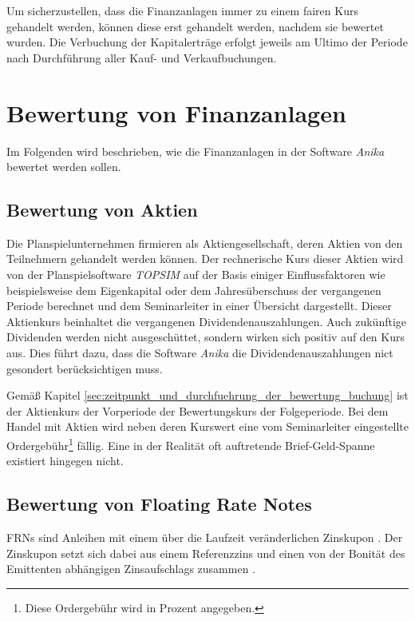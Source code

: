 \documentclass[12pt, a4paper]{article}
\theoremstyle{plain}
\begin{document}
Um sicherzustellen, dass die Finanzanlagen immer zu einem fairen Kurs gehandelt werden, können diese erst gehandelt werden, nachdem sie bewertet wurden. 
Die Verbuchung der Kapitalerträge erfolgt jeweils am Ultimo der Periode nach Durchführung aller Kauf- und Verkaufbuchungen.

\section{Bewertung von Finanzanlagen}
\label{sec:bewertung_von_finanzanlagen}
Im Folgenden wird beschrieben, wie die Finanzanlagen in der Software \textit{Anika} bewertet werden sollen.

\subsection{Bewertung von Aktien}
\label{sec:bewertung_von_aktien}
Die Planspielunternehmen firmieren als Aktiengesellschaft, deren Aktien von den Teilnehmern gehandelt werden können.
Der rechnerische Kurs dieser Aktien wird von der Planspielsoftware \textit{TOPSIM} auf der Basis einiger Einflussfaktoren wie beispielsweise dem Eigenkapital oder dem Jahresüberschuss der vergangenen Periode berechnet und dem Seminarleiter in einer Übersicht dargestellt.
Dieser Aktienkurs beinhaltet die vergangenen Dividendenauszahlungen. Auch zukünftige Dividenden werden nicht ausgeschüttet, sondern wirken sich positiv auf den Kurs aus. Dies führt dazu, dass die Software \textit{Anika} die Dividendenauszahlungen nict gesondert berücksichtigen muss.

Gemäß Kapitel \ref{sec:zeitpunkt_und_durchfuehrung_der_bewertung_buchung} ist der Aktienkurs der Vorperiode der Bewertungskurs der Folgeperiode.
Bei dem Handel mit Aktien wird neben deren Kurswert eine vom Seminarleiter eingestellte Ordergebühr\footnote{Diese Ordergebühr wird in Prozent angegeben.} fällig. Eine in der Realität oft auftretende Brief-Geld-Spanne existiert hingegen nicht.

\subsection{Bewertung von Floating Rate Notes}
\label{sec:bewertung_von_floating_rate_notes}
\glspl{FRN} sind Anleihen mit einem über die Laufzeit veränderlichen Zinskupon \autocite[][373]{fabozzi_handbook_2005}. Der Zinskupon setzt sich dabei aus einem Referenzzins und einen von der Bonität des Emittenten abhängigen Zinsaufschlags zusammen \autocite[][374]{fabozzi_handbook_2005}.
\end{document}
